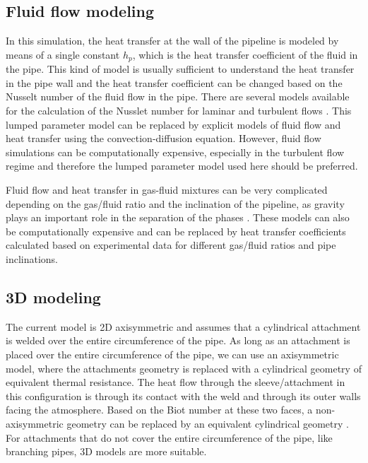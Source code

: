 \documentclass{article}
\makeatletter
\newcommand{\autocitel}[1]{\autocite{#1}\checknextarg}
\newcommand{\checknextarg}{\@ifnextchar\bgroup{\gobblenextarg}{}}
\newcommand{\gobblenextarg}[1]{$^,$\autocite{#1}\@ifnextchar\bgroup{\gobblenextarg}{}}
\makeatother
\begin{document}
\subsection{Fluid flow modeling}
In this simulation, the heat transfer at the wall of the pipeline is modeled by means of a single constant $h_p$, which is the heat transfer coefficient of the fluid in the pipe. This kind of model is usually sufficient to understand the heat transfer in the pipe wall and the heat transfer coefficient can be changed based on the Nusselt number of the fluid flow in the pipe. There are several models available for the calculation of the Nusslet number for laminar and turbulent flows \autocitel{nagy2018basic}. This lumped parameter model can be replaced by explicit models of fluid flow and heat transfer using the convection-diffusion equation. However, fluid flow simulations can be computationally expensive, especially in the turbulent flow regime and therefore the lumped parameter model used here should be preferred.

Fluid flow and heat transfer in gas-fluid mixtures can be very complicated depending on the gas/fluid ratio and the inclination of the pipeline, as gravity plays an important role in the separation of the phases \autocitel{zhang2006unified}. These models can also be computationally expensive and can be replaced by heat transfer coefficients calculated based on experimental data for different gas/fluid ratios and pipe inclinations\autocitel{kim1999comparison}{kim2002heat}{ghajar2010importance}. 
 

\subsection{3D modeling}
 The current model is 2D axisymmetric and assumes that a cylindrical attachment is welded over the entire circumference of the pipe. As long as an attachment is placed over the entire circumference of the pipe, we can use an axisymmetric model, where the attachments geometry is replaced with a cylindrical geometry of equivalent thermal resistance. The heat flow through the sleeve/attachment in this configuration is through its contact with the weld and through its outer walls facing the atmosphere. Based on the Biot number at these two faces, a non-axisymmetric geometry can be replaced by an equivalent cylindrical geometry \autocitel{fisher1996efficient}. For attachments that do not cover the entire circumference of the pipe, like branching pipes, 3D models are more suitable\autocitel{xue2007numerical}.   
\end{document}
